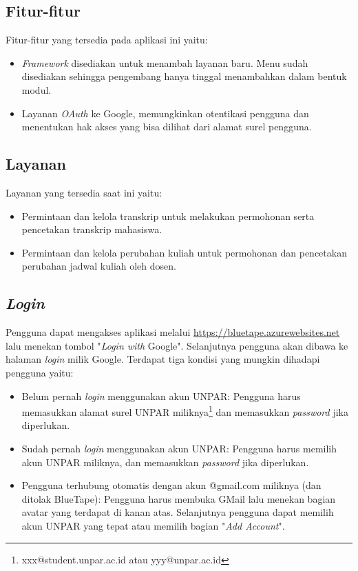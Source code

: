 \subsection{Fitur-fitur}
\label{sec:bluetape_fitur}
Fitur-fitur yang tersedia pada aplikasi ini yaitu:
\begin{itemize}
	\item \textit{Framework} disediakan untuk menambah layanan baru. Menu sudah disediakan sehingga pengembang hanya tinggal menambahkan dalam bentuk modul.
	\item Layanan \textit{OAuth} ke Google, memungkinkan otentikasi pengguna dan menentukan hak akses yang bisa dilihat dari alamat surel pengguna.
\end{itemize}

\subsection{Layanan}
\label{sec:bluetape_layanan}
Layanan yang tersedia saat ini yaitu:
\begin{itemize}
	\item Permintaan dan kelola transkrip untuk melakukan permohonan serta pencetakan transkrip mahasiswa.
	\item Permintaan dan kelola perubahan kuliah untuk permohonan dan pencetakan perubahan jadwal kuliah oleh dosen.
\end{itemize}

\subsection{\textit{Login}}
\label{sec:bluetape_login}
Pengguna dapat mengakses aplikasi melalui \url{https://bluetape.azurewebsites.net} lalu menekan tombol "\textit{Login with} Google". Selanjutnya pengguna akan dibawa ke halaman \textit{login} milik Google. Terdapat tiga kondisi yang mungkin dihadapi pengguna yaitu:
\begin{itemize}
	\item Belum pernah \textit{login} menggunakan akun UNPAR: Pengguna harus memasukkan alamat surel UNPAR miliknya\footnote{xxx@student.unpar.ac.id atau yyy@unpar.ac.id} dan memasukkan \textit{password} jika diperlukan.
	\item Sudah pernah \textit{login} menggunakan akun UNPAR: Pengguna harus memilih akun UNPAR miliknya, dan memasukkan \textit{password} jika diperlukan.
	\item Pengguna terhubung otomatis dengan akun @gmail.com miliknya (dan ditolak BlueTape): Pengguna harus membuka GMail lalu menekan bagian avatar yang terdapat di kanan atas. Selanjutnya pengguna dapat memilih akun UNPAR yang tepat atau memilih bagian "\textit{Add Account}".
\end{itemize}

